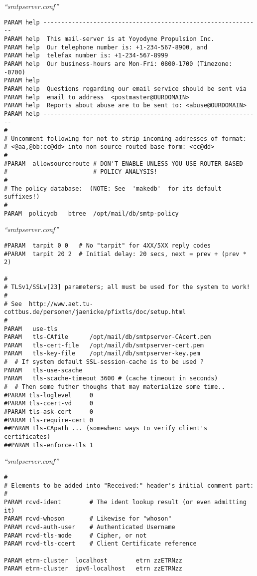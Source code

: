 \documentclass[a4paper,landscape]{slides}
\begin{document}
\begin{overlay}
\small
\centerline{{\em ``smtpserver.conf''}}
\tiny
\begin{verbatim}
PARAM help -------------------------------------------------------------
PARAM help  This mail-server is at Yoyodyne Propulsion Inc.
PARAM help  Our telephone number is: +1-234-567-8900, and
PARAM help  telefax number is: +1-234-567-8999
PARAM help  Our business-hours are Mon-Fri: 0800-1700 (Timezone: -0700)
PARAM help
PARAM help  Questions regarding our email service should be sent via
PARAM help  email to address  <postmaster@OURDOMAIN>
PARAM help  Reports about abuse are to be sent to: <abuse@OURDOMAIN>
PARAM help -------------------------------------------------------------
#
# Uncomment following for not to strip incoming addresses of format:
# <@aa,@bb:cc@dd> into non-source-routed base form: <cc@dd>
#
#PARAM  allowsourceroute # DON'T ENABLE UNLESS YOU USE ROUTER BASED
#                        # POLICY ANALYSIS!
#
# The policy database:  (NOTE: See  'makedb'  for its default suffixes!)
#
PARAM  policydb   btree  /opt/mail/db/smtp-policy
\end{verbatim}
\vfill
\end{overlay}
\begin{overlay}
\small
\centerline{{\em ``smtpserver.conf''}}
\tiny
\begin{verbatim}
#PARAM  tarpit 0 0   # No "tarpit" for 4XX/5XX reply codes
#PARAM  tarpit 20 2  # Initial delay: 20 secs, next = prev + (prev * 2)

#
# TLSv1/SSLv[23] parameters; all must be used for the system to work!
#
# See  http://www.aet.tu-cottbus.de/personen/jaenicke/pfixtls/doc/setup.html
#
PARAM   use-tls
PARAM   tls-CAfile      /opt/mail/db/smtpserver-CAcert.pem
PARAM   tls-cert-file   /opt/mail/db/smtpserver-cert.pem
PARAM   tls-key-file    /opt/mail/db/smtpserver-key.pem
#  # If system default SSL-session-cache is to be used ?
PARAM   tls-use-scache
PARAM   tls-scache-timeout 3600 # (cache timeout in seconds)
#  # Then some futher thoughs that may materialize some time..
#PARAM tls-loglevel     0
#PARAM tls-ccert-vd     0
#PARAM tls-ask-cert     0
#PARAM tls-require-cert 0
##PARAM tls-CApath ... (somewhen: ways to verify client's certificates)
##PARAM tls-enforce-tls 1
\end{verbatim}
\vfill
\end{overlay}
\begin{overlay}
\small
\centerline{{\em ``smtpserver.conf''}}
\tiny
\begin{verbatim}
#
# Elements to be added into "Received:" header's initial comment part:
#
PARAM rcvd-ident        # The ident lookup result (or even admitting it)
PARAM rcvd-whoson       # Likewise for "whoson"
PARAM rcvd-auth-user    # Authenticated Username
PARAM rcvd-tls-mode     # Cipher, or not
PARAM rcvd-tls-ccert    # Client Certificate reference

PARAM etrn-cluster  localhost        etrn zzETRNzz
PARAM etrn-cluster  ipv6-localhost   etrn zzETRNzz
\end{verbatim}
\vfill
\end{overlay}
\end{document}
